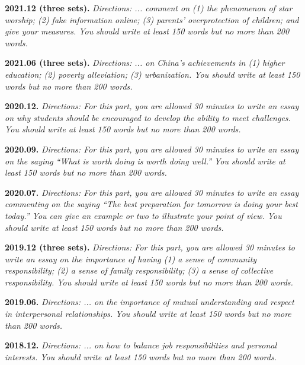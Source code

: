 \noindent\textbf{2021.12 (three sets).}\quad
\emph{Directions: ... comment on (1) the phenomenon of star worship; (2) fake information online; (3) parents' overprotection of children; and give your measures. You should write at least 150 words but no more than 200 words.}
\par\medskip

\noindent\textbf{2021.06 (three sets).}\quad
\emph{Directions: ... on China's achievements in (1) higher education; (2) poverty alleviation; (3) urbanization. You should write at least 150 words but no more than 200 words.}
\par\medskip

\noindent\textbf{2020.12.}\quad
\emph{Directions: For this part, you are allowed 30 minutes to write an essay on why students should be encouraged to develop the ability to meet challenges. You should write at least 150 words but no more than 200 words.}
\par\medskip

\noindent\textbf{2020.09.}\quad
\emph{Directions: For this part, you are allowed 30 minutes to write an essay on the saying ``What is worth doing is worth doing well.'' You should write at least 150 words but no more than 200 words.}
\par\medskip

\noindent\textbf{2020.07.}\quad
\emph{Directions: For this part, you are allowed 30 minutes to write an essay commenting on the saying ``The best preparation for tomorrow is doing your best today.'' You can give an example or two to illustrate your point of view. You should write at least 150 words but no more than 200 words.}
\par\medskip

\noindent\textbf{2019.12 (three sets).}\quad
\emph{Directions: For this part, you are allowed 30 minutes to write an essay on the importance of having (1) a sense of community responsibility; (2) a sense of family responsibility; (3) a sense of collective responsibility. You should write at least 150 words but no more than 200 words.}
\par\medskip

\noindent\textbf{2019.06.}\quad
\emph{Directions: ... on the importance of mutual understanding and respect in interpersonal relationships. You should write at least 150 words but no more than 200 words.}
\par\medskip

\noindent\textbf{2018.12.}\quad
\emph{Directions: ... on how to balance job responsibilities and personal interests. You should write at least 150 words but no more than 200 words.}
\par\medskip

